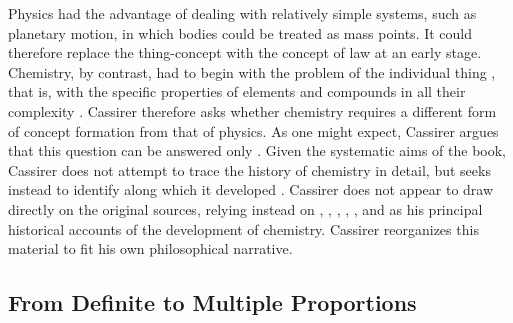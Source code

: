 \documentclass[submitted,12pt]{article}
\renewcommand{\SF}[2]{\citep[#1/#2]{Cassirer1910}}
\begin{document}
Physics had the advantage of dealing with relatively simple systems, such as planetary motion, in which bodies could be treated as  mass points. It could therefore replace the thing-concept  with the concept of law  at an early stage. Chemistry, by contrast, had to begin with the problem of the individual thing , that is, with the specific properties of elements and compounds in all their complexity \SF{271}{204}. Cassirer therefore asks whether chemistry requires a different form of concept formation from that of physics. As one might expect, Cassirer argues that this question can be answered only  \SF{272}{204}. Given the systematic aims of the book, Cassirer does not attempt to trace the history of chemistry in detail, but seeks instead to identify  along which it developed \SF{272}{204}.  Cassirer does not appear to draw directly on the original sources, relying instead on \citet{Wurtz1879}, \citet{Meyer1884}, \citet{Berthelot1885}, \citet{Ladenburg1902}, \citet{Duhem1902}, and \citet{Ostwald1906Leitlinien} as his principal historical accounts of the development of chemistry. Cassirer reorganizes this material to fit his own philosophical narrative. 

\subsection{From Definite to Multiple Proportions}
\end{document}
